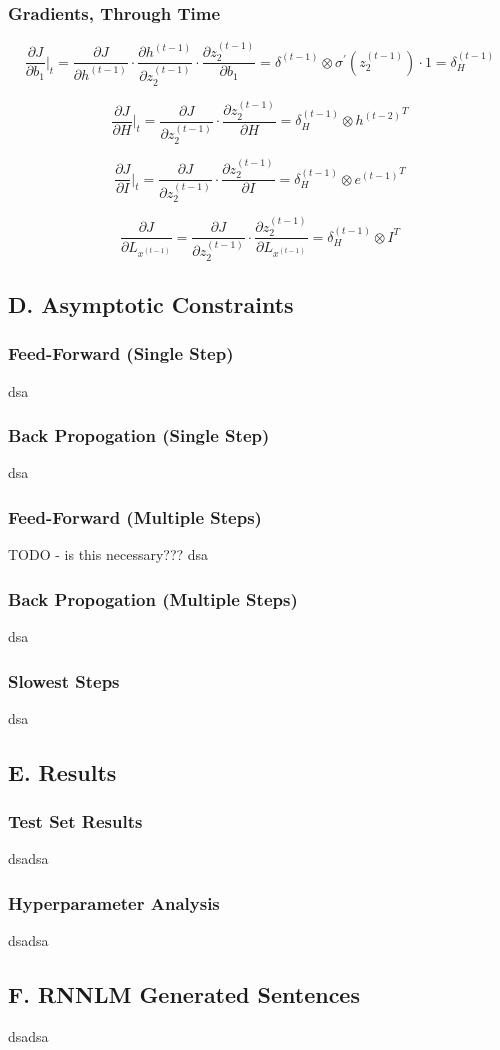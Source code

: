 \documentclass{article}
\begin{document}
\subsubsection*{Gradients, Through Time}

$$
	\frac {\partial J}{\partial b_1}\Big|_t = \frac {\partial J}{\partial h^{(t-1)}} \cdot \frac{\partial h^{(t-1)}}{\partial z_2^{(t-1)}} \cdot \frac{\partial z_2^{(t-1)}}{\partial b_1} = \delta^{(t-1)} \otimes \sigma^{'}\left(z_2^{(t-1)}\right) \cdot 1 = \delta_{H}^{(t-1)}
$$

$$
	\frac {\partial J}{\partial H} \Big|_t= \frac {\partial J}{\partial z_2^{(t-1)}} \cdot \frac{\partial z_2^{(t-1)}}{\partial  H} = \delta_{H}^{(t-1)} \otimes {h^{(t-2)}}^{T}
$$

$$
	\frac {\partial J}{\partial I} \Big|_t= \frac {\partial J}{\partial z_2^{(t-1)}} \cdot \frac{\partial z_2^{(t-1)}}{\partial  I} = \delta_{H}^{(t-1)} \otimes {e^{(t-1)}}^{T}
$$

$$
	\frac {\partial J}{\partial L_{x^{(t-1)}}} = \frac {\partial J}{\partial z_2^{(t-1)}} \cdot \frac{\partial z_2^{(t-1)}}{\partial  L_{x^{(t-1)}}} = \delta_{H}^{(t-1)} \otimes I^{T}
$$


\subsection*{D. Asymptotic Constraints}
\subsubsection*{Feed-Forward (Single Step)}
dsa

\subsubsection*{Back Propogation (Single Step)}
dsa

\subsubsection*{Feed-Forward (Multiple Steps)}
TODO - is this necessary??? dsa

\subsubsection*{Back Propogation (Multiple Steps)}
dsa

\subsubsection*{Slowest Steps}
dsa


\subsection*{E. Results}
\subsubsection*{Test Set Results}
dsadsa

\subsubsection*{Hyperparameter Analysis}
dsadsa


\subsection*{F. \textbf{RNNLM} Generated Sentences }
dsadsa
\end{document}

